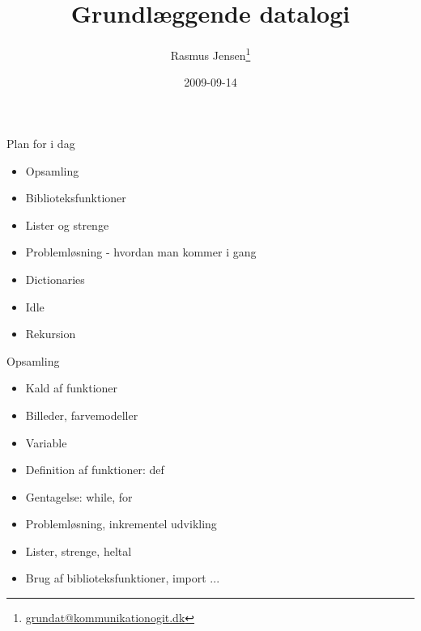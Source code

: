 \documentclass[a4paper,landscape]{slides}
\title{Grundlæggende datalogi}
\author{Rasmus Jensen\footnote{\url{grundat@kommunikationogit.dk}}}
\date{2009-09-14}
\begin{document}
\maketitle


\begin{slide}
	\begin{center} {\large 
            Plan for i dag
	} \end{center}
	\begin{itemize} \addtolength{\itemsep}{-\baselineskip}
		\item Opsamling
		\item Biblioteksfunktioner
                \item Lister og strenge
		\item Problemløsning - hvordan man kommer i gang
                \item Dictionaries
		\item Idle
		\item Rekursion
	\end{itemize}
\end{slide}

\begin{slide}
	\begin{center} {\large 
            Opsamling
	} \end{center}
	\begin{itemize} \addtolength{\itemsep}{-\baselineskip}
                \item Kald af funktioner
                \item Billeder, farvemodeller
                \item Variable
                \item Definition af funktioner: def
                \item Gentagelse: while, for
                \item Problemløsning, inkrementel udvikling
                \item Lister, strenge, heltal
                \item Brug af biblioteksfunktioner, import ...
	\end{itemize}
\end{slide}
\end{document}
